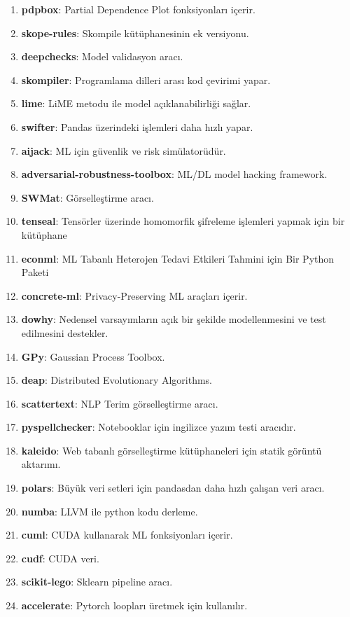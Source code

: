 \begin{enumerate}
    \item \textbf{pdpbox}: Partial Dependence Plot fonksiyonları içerir.
    \item \textbf{skope-rules}: Skompile kütüphanesinin ek versiyonu.
    \item \textbf{deepchecks}: Model validasyon aracı.
    \item \textbf{skompiler}: Programlama dilleri arası kod çevirimi yapar.
    \item \textbf{lime}: LiME metodu ile model açıklanabilirliği sağlar.
    \item \textbf{swifter}: Pandas üzerindeki işlemleri daha hızlı yapar.
    \item \textbf{aijack}: ML için güvenlik ve risk simülatorüdür.
    \item \textbf{adversarial-robustness-toolbox}: ML/DL model hacking framework.
    \item \textbf{SWMat}: Görselleştirme aracı.
    \item \textbf{tenseal}: Tensörler üzerinde homomorfik şifreleme işlemleri yapmak için bir kütüphane
    \item \textbf{econml}: ML Tabanlı Heterojen Tedavi Etkileri Tahmini için Bir Python Paketi
    \item \textbf{concrete-ml}: Privacy-Preserving ML araçları içerir.
    \item \textbf{dowhy}: Nedensel varsayımların açık bir şekilde modellenmesini ve test edilmesini destekler.
    \item \textbf{GPy}: Gaussian Process Toolbox.
    \item \textbf{deap}: Distributed Evolutionary Algorithms.
    \item \textbf{scattertext}: NLP Terim görselleştirme aracı.
    \item \textbf{pyspellchecker}: Notebooklar için ingilizce yazım testi aracıdır.
    \item \textbf{kaleido}: Web tabanlı görselleştirme kütüphaneleri için statik görüntü aktarımı.
    \item \textbf{polars}: Büyük veri setleri için pandasdan daha hızlı çalışan veri aracı.
    \item \textbf{numba}: LLVM ile python kodu derleme.
    \item \textbf{cuml}: CUDA kullanarak ML fonksiyonları içerir.
    \item \textbf{cudf}: CUDA veri.
    \item \textbf{scikit-lego}: Sklearn pipeline aracı.
    \item \textbf{accelerate}: Pytorch loopları üretmek için kullanılır.

\end{enumerate}
